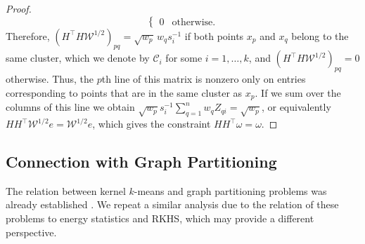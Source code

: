 \documentclass[aps,preprint,nofootinbib,floatfix]{revtex4-1}
\newcommand\C{{\mathcal{C}}}
\newcommand\e{e}
\newcommand\om{\omega}
\begin{document}
\begin{proof}
\begin{equation}
\begin{cases}
0 & \mbox{otherwise}.
\end{cases}
\end{equation}
Therefore, $(H^\top H \mathcal{W}^{1/2})_{pq} = \sqrt{w_p} \, w_q s_i^{-1}$
if both points $x_p$ and $x_q$ belong to the same cluster, which
we denote by $\C_i$ for some $i=1,\dotsc,k$, and 
$(H^\top H \mathcal{W}^{1/2})_{pq} = 0 $ otherwise. Thus, the $p$th
line of this matrix is nonzero only on entries corresponding to points
that are in the same cluster as $x_p$. If we sum over the columns of this
line we obtain $\sqrt{w_p} s_i^{-1} \sum_{q=1}^n w_q Z_{qi} = \sqrt{w_p}$,
or equivalently $H H^\top \mathcal{W}^{1/2} \e = \mathcal{W}^{1/2} \e$,
which gives the constraint $H H^\top \om = \om$.
\end{proof}


\subsection*{Connection with Graph Partitioning}

The relation between kernel $k$-means and graph partitioning problems
was already established \cite{Dhillon2,Dhillon}. We repeat a similar analysis
due to the relation of these problems to
energy statistics and RKHS, which may provide a different perspective.
\end{document}
